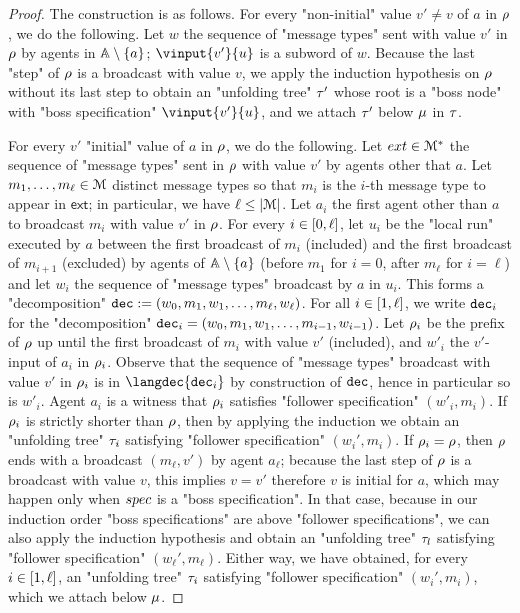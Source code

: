\begin{proof}
	The construction is as follows.
	For every  "non-initial" value $v' \ne v$ of $a$ in $\rho$, we do the following. Let $w$ the sequence of "message types" sent with value $v'$ in $\rho$ by agents in $\mathbb{A} \setminus \{a\}$; $\vinput{v'}{u}$ is a subword of $w$. Because the last "step" of $\rho$ is a broadcast with value $v$, we apply the induction hypothesis on $\rho$ without its last step to obtain an "unfolding tree" $\tau'$ whose root is a "boss node" with "boss specification" $\vinput{v'}{u}$, and we attach $\tau'$ below $\mu$ in $\tau$.


	For every $v'$ "initial" value of $a$ in $\rho$, we do the following.  
	Let $\mathsf{ext} \in \messages^*$ the sequence of "message types" sent in $\rho$ with value $v'$ by agents other that $a$. Let $m_1, \dots, m_\ell \in \mathcal{M}$ distinct message types so that $m_i$ is the $i$-th message type to appear in $\mathsf{ext}$; in particular, we have $\ell \leq |\mathcal{M}|$. 
	Let $a_i$ the first agent other than $a$ to broadcast $m_i$ with value $v'$ in $\rho$. For every $i \in [0,\ell]$, let $u_i$ be the "local run" executed by $a$ between the first broadcast of $m_i$ (included) and the first broadcast of $m_{i+1}$ (excluded) by agents of $\mathbb{A} \setminus \{a\}$ (before $m_1$ for $i=0$, after $m_\ell$ for $i = \ell$) and let $w_i$ the sequence of "message types" broadcast by $a$ in $u_i$. This forms a "decomposition" $\mathtt{dec} := (w_0, m_1, w_1, \ldots, m_\ell, w_\ell)$.
	For all $i \in [1,\ell]$, we write $\mathtt{dec}_i$ for the "decomposition" $\mathtt{dec}_i = (w_0, m_1, w_1, \ldots, m_{i-1}, w_{i-1})$. Let $\rho_i$ be the prefix of $\rho$ up until the first broadcast of $m_i$ with value $v'$ (included), and $w'_i$ the $v'$-input of $a_i$ in $\rho_i$. Observe that the sequence of "message types" broadcast with value $v'$ in $\rho_i$ is in $\langdec{\decsymb_i}$ by construction of $\mathtt{dec}$, hence in particular so is $w'_i$. Agent $a_i$ is a witness that $\rho_i$ satisfies "follower specification" $(w'_i, m_i)$. 
	If $\rho_i$ is strictly shorter than $\rho$, then by applying the induction we obtain an "unfolding tree" $\tau_i$ satisfying "follower specification" $(w_i', m_i)$. If $\rho_i = \rho$, then $\rho$ ends with a broadcast $(m_\ell,v')$ by agent $a_\ell$; because the last step of $\rho$ is a broadcast with value $v$, this implies $v = v'$ therefore $v$ is initial for $a$, which may happen only when $\spec$ is a "boss specification". In that case, because in our induction order "boss specifications" are above "follower specifications", we can also apply the induction hypothesis and obtain an "unfolding tree" $\tau_l$ satisfying "follower specification" $(w_\ell', m_\ell)$. Either way, we have obtained, for every $i \in [1,\ell]$, an "unfolding tree" $\tau_i$ satisfying "follower specification" $(w_i', m_i)$, which we attach below $\mu$. 
	

\end{proof}
